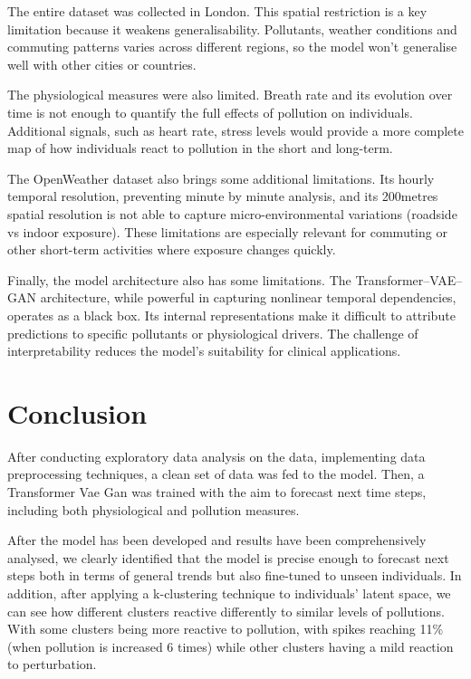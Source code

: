 \documentclass[12pt,a4paper]{report}
\begin{document}
The entire dataset was collected in London. This spatial restriction is
a key limitation because it weakens generalisability. Pollutants,
weather conditions and commuting patterns varies across different
regions, so the model won't generalise well with other cities or
countries.

The physiological measures were also limited. Breath rate and its
evolution over time is not enough to quantify the full effects of
pollution on individuals. Additional signals, such as heart rate, stress
levels would provide a more complete map of how individuals react to
pollution in the short and long-term.

The OpenWeather dataset also brings some additional limitations. Its
hourly temporal resolution, preventing minute by minute analysis, and
its 200metres spatial resolution is not able to capture
micro-environmental variations (roadside vs indoor exposure). These
limitations are especially relevant for commuting or other short-term
activities where exposure changes quickly.

Finally, the model architecture also has some limitations. The
Transformer--VAE--GAN architecture, while powerful in capturing
nonlinear temporal dependencies, operates as a black box. Its internal
representations make it difficult to attribute predictions to specific
pollutants or physiological drivers. The challenge of interpretability
reduces the model's suitability for clinical applications.

\chapter{Conclusion}
After conducting exploratory data analysis on the data, implementing
data preprocessing techniques, a clean set of data was fed to the model.
Then, a Transformer Vae Gan was trained with the aim to forecast next
time steps, including both physiological and pollution measures.

After the model has been developed and results have been comprehensively
analysed, we clearly identified that the model is precise enough to
forecast next steps both in terms of general trends but also fine-tuned
to unseen individuals. In addition, after applying a k-clustering
technique to individuals' latent space, we can see how different
clusters reactive differently to similar levels of pollutions. With some
clusters being more reactive to pollution, with spikes reaching 11\%
(when pollution is increased 6 times) while other clusters having a mild
reaction to perturbation.
\end{document}
